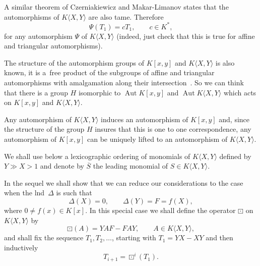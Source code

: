 A similar theorem of Czerniakiewicz \cite{Cz1, Cz2} and Makar-Limanov \cite{ML} states that the automorphisms of $K\langle X,Y\rangle$ are also tame. Therefore
\[
\Psi(T_1) = cT_1, \qquad c \in K^{\ast},
\]
for any automorphism $\Psi$ of $K\langle X,Y\rangle$ (indeed, just check that this is true for affine and triangular automorphisms).

The structure of the automorphism groups of $K[x, y]$ and $K\langle X,Y\rangle$ is also known, it is a~free product of the subgroups of affine and triangular automorphisms with amalgamation along their intersection~\cite{Se}. So we can think that there is a group $H$ isomorphic to $\operatorname{Aut}K[x,y]$ and $\operatorname{Aut}K\langle X,Y\rangle$ which acts on $K[x, y]$ and $K\langle X,Y\rangle$.

Any automorphism of $K\langle X,Y\rangle$ induces an automorphism of $K[x, y]$ and, since the structure of the group $H$ insures that this is one to one correspondence, any automorphism of $K[x,y]$ can be uniquely lifted to an automorphism of $K\langle X,Y\rangle$.

We shall use below a lexicographic ordering of monomials of $K\langle X,Y\rangle$ defined by $Y\gg X > 1$ and denote by $\overline{S}$ the leading monomial of $S \in K\langle X,Y\rangle$.

In the sequel we shall show that we can reduce our considerations to the case when the lnd~$\Delta$ is such that
\[
\Delta(X)=0,\qquad \Delta(Y)=F=f(X),
\]
where $0\not=f(x)\in K[x]$. In this special case we shall define the operator $\boxdot$ on $K\langle X,Y\rangle$ by
\[
\boxdot(A)= YAF - FAY,\qquad A\in K\langle X,Y\rangle,
\]
and shall fix the sequence $T_1,T_2,\ldots$, starting with $T_1= YX - XY$ and then inductively
\[
T_{i+1} = \boxdot^i(T_1).
\]

